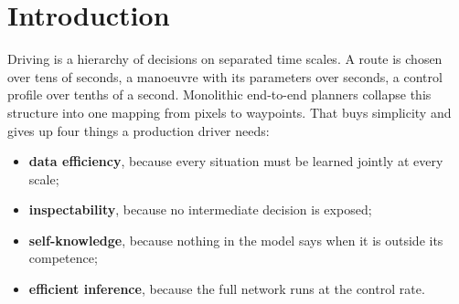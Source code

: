 \documentclass[10pt,twocolumn]{article}
\theoremstyle{remark}
\newcommand{\tier}[1]{\textsc{\small #1}}
\begin{document}
\begin{abstract}
to the hand-calibrated margin on the unsafe rate and equal or cheaper on 6\,s error (QHEAD-U-EQUAL-QF, QHEAD-CHEAPER-QF, two checkpoints per type, \tier{T1-kin}); the cost of the rule against no rule stays (QHEAD-COSTS) and its contact rate lies above the label-fed rule. A planner that checks kinematic candidates against the imagined gap cuts the unsafe rate at the bases of two new seeds ($-0.0347$ $[-0.0582,-0.0146]$, IMAG-LEVEL-CUTS-UNSAFE-CONFIRMED) and is not better than plain extrapolation of the lead ($+0.0169$ $[+0.0035,+0.0316]$, IMAG-LEVEL-WORSE-THAN-EXTRAPOLATION); its response on the model's own plans is met only at the weight 0.001, whose level is not kept; the explicit future-token target is flat (TARGET-FLAT); a pilot of a finer token grid is not named because a control failed. Every number of this paragraph is a diagnostic on logged frames, none is driving performance; the STRATEGIC family is paused in the reads dated before the PI ruling of 2026-11-16 and not computed (n = 0) in the later ones. Pre-registered and running without a result: two interior weights of the level term and a replicate of the finer grid with eight seeds (card ADD43). All of it rests on an evaluation
doctrine built for decisions rather than leaderboards: pre-registered bars with both outcomes committed, episode-cluster bootstrap
intervals, explicit seed variance and four metric families on every evaluation. We close with the remaining frontier (assertive
launch from standstill), the re-rendered simulation tier built to address it, and a research roadmap toward a 4B driver within a
budget of at most 800\,M parameters, deployable within 100\,ms on an edge computer.
\end{abstract}

\section{Introduction}
Driving is a hierarchy of decisions on separated time scales. A route is chosen over tens of seconds, a manoeuvre with its
parameters over seconds, a control profile over tenths of a second. Monolithic end-to-end planners collapse this structure into one
mapping from pixels to waypoints. That buys simplicity and gives up four things a production driver needs:
\begin{itemize}
  \item \textbf{data efficiency}, because every situation must be learned jointly at every scale;
  \item \textbf{inspectability}, because no intermediate decision is exposed;
  \item \textbf{self-knowledge}, because nothing in the model says when it is outside its competence;
  \item \textbf{efficient inference}, because the full network runs at the control rate.
\end{itemize}
\end{document}
